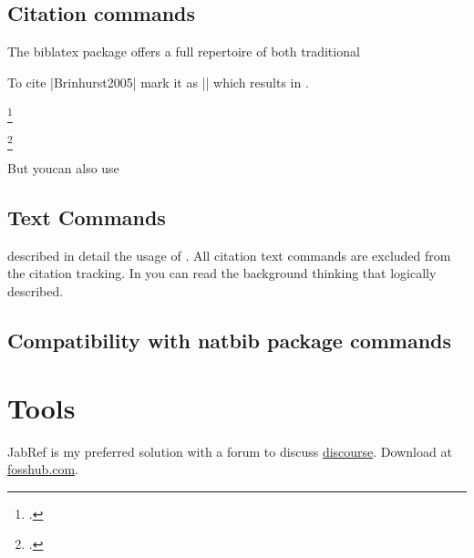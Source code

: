 \begin{refsection}
\subsection{Citation commands}

The biblatex package offers a full repertoire of both traditional 

To cite |Brinhurst2005| mark it as |\cite{Bringhurst2005}| which results in \cite{Bringhurst2005}.

\parencite{Bringhurst2005}

\footcite{Bringhurst2005}

\footcitetext{Lamport1994}

But youcan also use \autocite{Lamport1994}

\subsection{Text Commands}

\citeauthor{Lamport1994} described in detail the usage of \latex. All citation text commands
are excluded from the citation tracking. In  you can read the background
thinking that logically described.


\subsection{Compatibility with natbib package commands}




\section*{Tools}
JabRef is my preferred solution with a forum to discuss \href{http://discourse.jabref.org/}{discourse}. Download at \href{https://www.fosshub.com/JabRef.html}{fosshub.com}. 

\printbibliography

\end{refsection}
